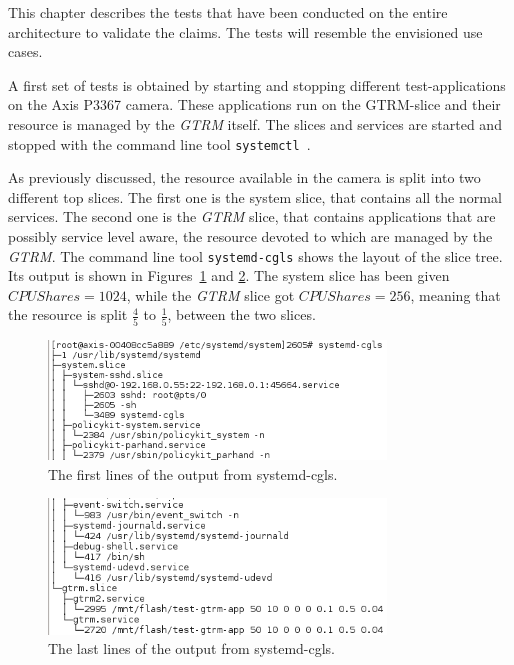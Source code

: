 \documentclass[nobiblatex]{LTHthesis}
\begin{document}
This chapter describes the tests that have been conducted on the entire
architecture to validate the claims. The tests will resemble the envisioned
use cases.

A first set of tests is obtained by starting and stopping different 
test-applications on the Axis P3367 camera. These applications run on 
the GTRM-slice and their resource is managed by the \emph{GTRM} itself. The slices
and services are started and stopped with the command line tool 
\texttt{systemctl}~\cite{systemctl}.

As previously discussed, the resource available in the camera is split into
two different top slices. The first one is the system slice, that contains
all the normal services. The second one is the \emph{GTRM} slice, that contains
applications that are possibly service level aware, the resource devoted to
which are managed by the \emph{GTRM}. The command line tool \texttt{systemd-cgls}
shows the layout of the slice tree. Its output is shown in
Figures~\ref{fig:systemd-cgls2a} and \ref{fig:systemd-cgls2b}.
The system slice has been given $CPUShares = 1024$, while the \emph{GTRM} slice got 
$CPUShares = 256$, meaning that the resource is split $\frac{4}{5}$ to 
$\frac{1}{5}$, between the two slices. 

\begin{figure}[h]
    \centering
    \includegraphics[width=0.8\textwidth]{systemd-cgls2}
    \caption{The first lines of the output from  systemd-cgls.}
    \label{fig:systemd-cgls2a}
\end{figure}

\begin{figure}[h]
    \centering
    \includegraphics[width=0.8\textwidth]{systemd-cgls1}
    \caption{The last lines of the output from systemd-cgls.}
    \label{fig:systemd-cgls2b}
\end{figure}
\end{document}
